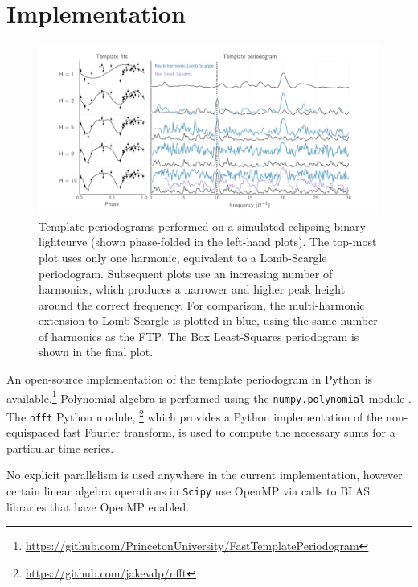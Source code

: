\documentclass[apj]{emulateapj}
\begin{document}

\section{Implementation}\label{sec:implementation}

\begin{figure}
    \centering
    \includegraphics[width=\textwidth]{plots/templates_and_periodograms.pdf}
    \caption{\label{fig:tempsandpdgs} Template periodograms performed on a simulated eclipsing
            binary lightcurve (shown phase-folded in the left-hand plots). The top-most plot
            uses only one harmonic, equivalent to a Lomb-Scargle periodogram. Subsequent plots
            use an increasing number of harmonics, which produces a narrower and higher peak
            height around the correct frequency. For comparison, the multi-harmonic extension
            to Lomb-Scargle is plotted in blue, using the same number of harmonics as the FTP.
            The Box Least-Squares \citep{Kovacs_2002} periodogram is shown in the final plot.}
\end{figure}

An open-source implementation of the template periodogram in Python is
available.\footnote{\url{https://github.com/PrincetonUniversity/FastTemplatePeriodogram}}
Polynomial algebra is performed using the \texttt{numpy.polynomial} module
\citep{Scipy}. The \texttt{nfft} Python module,
\footnote{\url{https://github.com/jakevdp/nfft}} which provides a Python
implementation of the non-equispaced fast Fourier transform,
is used to compute the necessary sums for a particular time series.

No explicit parallelism is used anywhere in the current implementation,
however certain linear algebra operations in \texttt{Scipy} use OpenMP
via calls to BLAS libraries that have OpenMP enabled.
\end{document}
